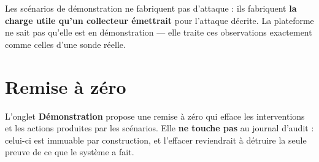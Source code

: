 \begin{tcolorbox}[colback=green!4!white, colframe=darkgreen,
  title=\textbf{Bon à savoir}, fonttitle=\bfseries, boxrule=0.6pt]
Les scénarios de démonstration ne fabriquent pas d'attaque : ils fabriquent
\textbf{la charge utile qu'un collecteur émettrait} pour l'attaque décrite. La
plateforme ne sait pas qu'elle est en démonstration --- elle traite ces
observations exactement comme celles d'une sonde réelle.
\end{tcolorbox}

\section{Remise à zéro}

L'onglet \textbf{Démonstration} propose une remise à zéro qui efface les
interventions et les actions produites par les scénarios. Elle \textbf{ne
touche pas} au journal d'audit : celui-ci est immuable par construction, et
l'effacer reviendrait à détruire la seule preuve de ce que le système a fait.
